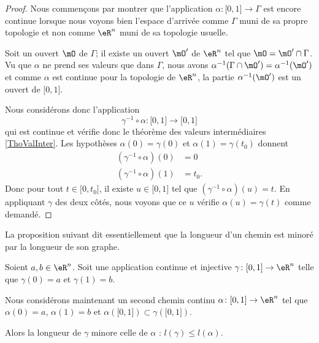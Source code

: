 \begin{proof}
	Nous commençons par montrer que l'application \( \alpha\colon \mathopen[ 0 , 1 \mathclose]\to \Gamma\) est encore continue lorsque nous voyons bien l'espace d'arrivée comme \( \Gamma\) muni de sa propre topologie et non comme \( \eR^n\) muni de sa topologie usuelle.

	Soit un ouvert \( \mO\) de \( \Gamma\); il existe un ouvert \( \mO'\) de \( \eR^n\) tel que \( \mO=\mO'\cap \Gamma\). Vu que \( \alpha\) ne prend ses valeurs que dans \( \Gamma\), nous avons \( \alpha^{-1}(\Gamma\cap \mO')=\alpha^{-1}(\mO')\) et comme \( \alpha\) est continue pour la topologie de \( \eR^n\), la partie \( \alpha^{-1}(\mO')\) est un ouvert de \( \mathopen[ 0 , 1 \mathclose]\).

	Nous considérons donc l'application
	\begin{equation}
		\gamma^{-1}\circ\alpha\colon \mathopen[ 0 , 1 \mathclose]\to \mathopen[ 0 , 1 \mathclose]
	\end{equation}
	qui est continue et vérifie donc le théorème des valeurs intermédiaires \ref{ThoValInter}. Les hypothèses \( \alpha(0)=\gamma(0)\) et \( \alpha(1)=\gamma(t_0)\) donnent
	\begin{subequations}
		\begin{align}
			(\gamma^{-1}\circ\alpha)(0) & =0    \\
			(\gamma^{-1}\circ\alpha)(1) & =t_0.
		\end{align}
	\end{subequations}
	Donc pour tout \( t\in \mathopen[ 0 , t_0 \mathclose]\), il existe \( u\in \mathopen[ 0 , 1 \mathclose]\) tel que \( (\gamma^{-1}\circ \alpha)(u)=t\). En appliquant \( \gamma\) des deux côtés, nous voyons que ce \( u\) vérifie \( \alpha(u)=\gamma(t)\) comme demandé.
\end{proof}

La proposition suivant dit essentiellement que la longueur d'un chemin est minoré par la longueur de son graphe.
\begin{proposition}      \label{PROPooXENVooMvkTZW}
	Soient \( a,b\in \eR^n\). Soit une application continue et injective \( \gamma\colon \mathopen[ 0 , 1 \mathclose]\to \eR^n\) telle que \( \gamma(0)=a\) et \( \gamma(1)=b\).

	Nous considérons maintenant un second chemin continu \( \alpha\colon \mathopen[ 0 , 1 \mathclose]\to \eR^n\) tel que \( \alpha(0)=a\), \( \alpha(1)=b\) et \( \alpha(\mathopen[ 0 , 1 \mathclose])\subset\gamma(\mathopen[ 0 , 1 \mathclose])\).

	Alors la longueur de \( \gamma\) minore celle de \( \alpha\) : \( l(\gamma)\leq l(\alpha)\).
\end{proposition}

